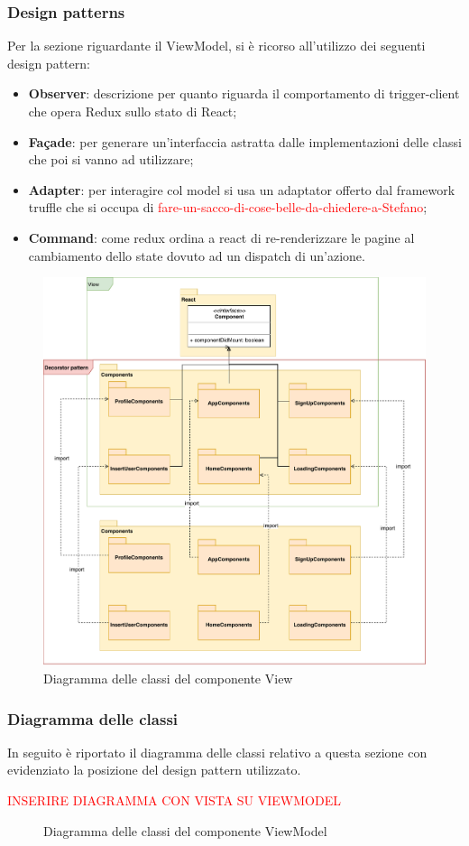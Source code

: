 		\subsubsection{Design patterns}
		Per la sezione riguardante il ViewModel, si è ricorso all'utilizzo dei seguenti design pattern:
			\begin{itemize}
				\item \textbf{Observer}: descrizione per quanto riguarda il comportamento di trigger-client che opera Redux sullo stato di React;
				\item \textbf{Façade}: per generare un'interfaccia astratta dalle implementazioni delle classi che poi si vanno ad utilizzare;
				\item \textbf{Adapter}: per interagire col model si usa un adaptator offerto dal framework truffle che si occupa di {\textcolor{red}{fare-un-sacco-di-cose-belle-da-chiedere-a-Stefano}};
				\item \textbf{Command}: come redux ordina a react di re-renderizzare le pagine al cambiamento dello state dovuto ad un dispatch di un'azione.
			\end{itemize}
				\begin{figure}[!h]
		\centering
			\includegraphics[height=0.5\textwidth]{./Diagrammi/DiagrammaView.pdf}
		\caption{Diagramma delle classi del componente View}
		\label{fig:DiagrammaView}
	\end{figure}
	
		\subsubsection{Diagramma delle classi}
		In seguito è riportato il diagramma delle classi relativo a questa sezione con evidenziato la posizione del design pattern utilizzato.
	
	{\textcolor{red}{INSERIRE DIAGRAMMA CON VISTA SU VIEWMODEL}}
	\begin{figure}[h]
		\centering
		\caption{Diagramma delle classi del componente ViewModel}
		\label{}
	\end{figure}
	
